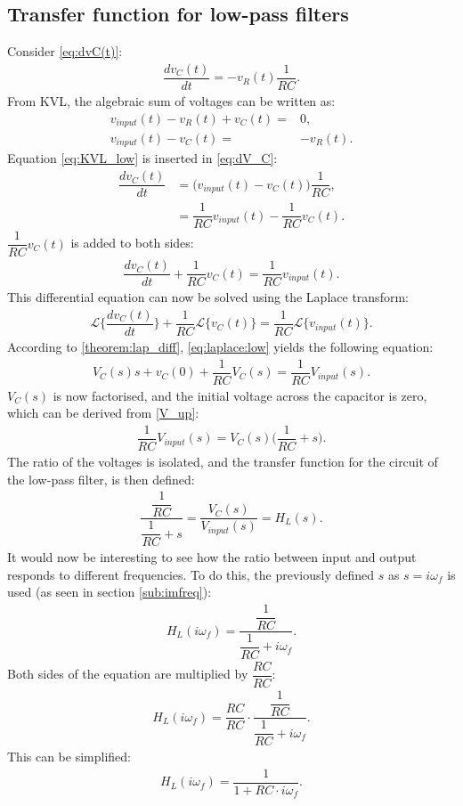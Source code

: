 \subsection{Transfer function for low-pass filters}
Consider \eqref{eq:dvC(t)}:
\begin{align} \label{eq:dV_C}
\dfrac{dv_C(t)}{dt}=-v_R(t)\dfrac{1}{RC}.
\end{align}
From KVL, the algebraic sum of voltages can be written as: 
\begin{align}
v_{input}(t)-v_{R}(t)+v_{C}(t)=&0,\nonumber
\\
 v_{input}(t) - v_{C}(t)=&-v_{R}(t). \label{eq:KVL_low}
\end{align}
Equation \eqref{eq:KVL_low} is inserted in \eqref{eq:dV_C}:
\begin{align*} 
\dfrac{dv_C(t)}{dt}&=\Big(v_{input}(t) - v_{C}(t)\Big)\dfrac{1}{RC},
\\
&=\dfrac{1}{RC}v_{input}(t) - \dfrac{1}{RC}v_{C}(t).
\end{align*}
$\dfrac{1}{RC}v_C(t)$ is added to both sides:
\begin{align*}
\dfrac{dv_C(t)}{dt}+\dfrac{1}{RC}v_C(t)=\dfrac{1}{RC}v_{input}(t).
\end{align*}
This differential equation can now be solved using the Laplace transform:
\begin{align}\label{eq:laplace:low}\mathcal{L}\bigg\{\dfrac{dv_C(t)}{dt}\bigg\}+\dfrac{1}{RC}\mathcal{L}\Big\{v_C(t)\Big\}=\dfrac{1}{RC}\mathcal{L}\Big\{v_{input}(t)\Big\}.
\end{align}
According to \cref{theorem:lap_diff}, \eqref{eq:laplace:low} yields the following equation:
\begin{align*}
V_C(s)s+v_C(0)+\dfrac{1}{RC}V_C(s)=\dfrac{1}{RC}V_{input}(s).
\end{align*} 
$V_{C}(s)$ is now factorised, and the initial voltage across the capacitor is zero, which can be derived from \eqref{V_up}:
\begin{align*}
\dfrac{1}{RC}V_{input}(s)=V_{C}(s)\Big(\dfrac{1}{RC}+s\Big).
\end{align*} 
The ratio of the voltages is isolated, and the transfer function for the circuit of the low-pass filter, is then defined:
\begin{align*}
\dfrac{\dfrac{1}{RC}}{\dfrac{1}{RC}+s} = \dfrac{V_{C}(s)}{V_{input}(s)}=H_L(s).
\end{align*}
It would now be interesting to see how the ratio between input and output responds to different frequencies. To do this, the previously defined $s$ as $s=i\omega_f$ is used (as seen in section \ref{sub:imfreq}):
\begin{align} \label{eq:trans_low}
H_{L}(i \omega_f) = \dfrac{\dfrac{1}{RC}}{\dfrac{1}{RC}+i \omega_f}. 
\end{align}
Both sides of the equation are multiplied by $\dfrac{RC}{RC}$:
\begin{align*}
H_{L}(i \omega_f) = \dfrac{RC}{RC} \cdot \dfrac{\dfrac{1}{RC}}{\dfrac{1}{RC}+i \omega_f}. 
\end{align*}
This can be simplified:
\begin{align*}
H_{L}(i \omega_f) =  \dfrac{1}{1+RC \cdot i \omega_f}. 
\end{align*}

